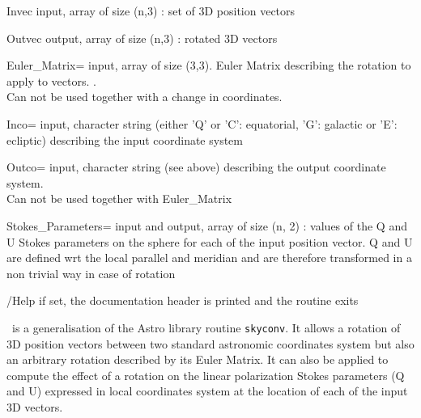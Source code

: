 \begin{qualifiers}
  \begin{qulist}{} %
    \item[Invec] 
      input,  array of size (n,3) : set of 3D position vectors
    \item[Outvec] 
     output, array of size (n,3) : rotated 3D vectors
    \item[Euler\_Matrix=] 
       input, array of size (3,3). Euler Matrix
       describing the rotation to apply to vectors.
       .\\
       Can not be used together with a change in coordinates.
    \item[Inco=] 
       input, character string (either 'Q' or 'C': equatorial,
    'G': galactic or 'E': ecliptic) describing the input coordinate system 
    \item[Outco=] 
        input, character string (see above) describing the output
          coordinate system.\\
    Can not be used together with Euler\_Matrix
    \item[Stokes\_Parameters=]
       input and output, array of size (n, 2) :
      values of the Q and U Stokes parameters on the sphere for each of
      the input position vector. Q and U are defined wrt the local
      parallel and meridian and are therefore transformed in a non
      trivial way in case of rotation
  \end{qulist}
\end{qualifiers}

\begin{keywords}
  \begin{kwlist}{} %
    \item[/Help] 
     if set, the documentation header is printed and the routine exits	
  \end{kwlist}
\end{keywords}  

\begin{codedescription}
{\thedocid \ is a generalisation of the Astro library routine {\tt skyconv}. It allows
a rotation of 3D position vectors between two standard astronomic coordinates
system but also an arbitrary rotation described by its Euler Matrix.
It can also be applied to compute the effect of a rotation on the
linear polarization Stokes parameters (Q and U) expressed in local
coordinates system at the location of each of the input 3D vectors.}
\end{codedescription}



